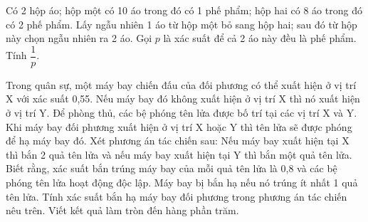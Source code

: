 \begin{ex}%
    Có 2 hộp áo; hộp một có 10 áo trong đó có 1 phế phẩm; hộp hai có 8 áo trong đó có 2 phế phẩm. Lấy ngẫu nhiên 1 áo từ hộp một bỏ sang hộp hai; sau đó từ hộp này chọn ngẫu nhiên ra 2 áo. Gọi $p$ là xác suất để cả 2 áo này đều là phế phẩm. Tính $\dfrac{1}{p}$.
\end{ex}
\begin{ex}%
    Trong quân sự, một máy bay chiến đấu của đối phương có thể xuất hiện ở vị trí X với xác suất 0,55. Nếu máy bay đó không xuất hiện ở vị trí X thì nó xuất hiện ở vị trí Y. Để phòng thủ, các bệ phóng tên lửa được bố trí tại các vị trí X và Y. Khi máy bay đối phương xuất hiện ở vị trí X hoặc Y thì tên lửa sẽ được phóng để hạ máy bay đó.
    Xét phương án tác chiến sau: Nếu máy bay xuất hiện tại X thì bắn 2 quả tên lửa và nếu máy bay xuất hiện tại Y thì bắn một quả tên lửa. Biết rằng, xác suất bắn trúng máy bay của mỗi quả tên lửa là 0,8 và các bệ phóng tên lửa hoạt động độc lập. Máy bay bị bắn hạ nếu nó trúng ít nhất 1 quả tên lửa. Tính xác suất bắn hạ máy bay đối phương trong phương án tác chiến nêu trên. Viết kết quả làm tròn đến hàng phần trăm.
\end{ex}
